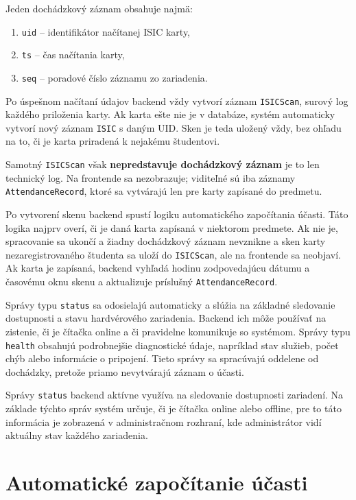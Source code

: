 Jeden dochádzkový záznam obsahuje najmä:
\begin{enumerate}
    \item \texttt{uid} -- identifikátor načítanej ISIC karty,
    \item \texttt{ts} -- čas načítania karty,
    \item \texttt{seq} -- poradové číslo záznamu zo zariadenia.
\end{enumerate}

Po úspešnom načítaní údajov backend vždy vytvorí záznam \texttt{ISICScan}, surový log každého priloženia karty. Ak karta ešte nie je v databáze, systém automaticky vytvorí nový záznam \texttt{ISIC} s daným UID. Sken je teda uložený vždy, bez ohľadu na to, či je karta priradená k nejakému študentovi.

Samotný \texttt{ISICScan} však \textbf{nepredstavuje dochádzkový záznam} je to len technický log. Na frontende sa nezobrazuje; viditeľné sú iba záznamy \texttt{AttendanceRecord}, ktoré sa vytvárajú len pre karty zapísané do predmetu.

Po vytvorení skenu backend spustí logiku automatického započítania účasti. Táto logika najprv overí, či je daná karta zapísaná v niektorom predmete. Ak nie je, spracovanie sa ukončí a žiadny dochádzkový záznam nevznikne a sken karty nezaregistrovaného študenta sa uloží do \texttt{ISICScan}, ale na frontende sa neobjaví. Ak karta je zapísaná, backend vyhľadá hodinu zodpovedajúcu dátumu a časovému oknu skenu a aktualizuje príslušný \texttt{AttendanceRecord}.

Správy typu \texttt{status} sa odosielajú automaticky a slúžia na základné sledovanie dostupnosti a stavu hardvérového zariadenia. Backend ich môže používať na zistenie, či je čítačka online a či pravidelne komunikuje so systémom. Správy typu \texttt{health} obsahujú podrobnejšie diagnostické údaje, napríklad stav služieb, počet chýb alebo informácie o pripojení. Tieto správy sa spracúvajú oddelene od dochádzky, pretože priamo nevytvárajú záznam o účasti.

Správy \texttt{status} backend aktívne využíva na sledovanie dostupnosti zariadení. Na základe týchto správ systém určuje, či je čítačka online alebo offline, pre to táto informácia je zobrazená v administračnom rozhraní, kde administrátor vidí aktuálny stav každého zariadenia.
\section{Automatické započítanie účasti}
\label{sec:backend-auto-attendance}

